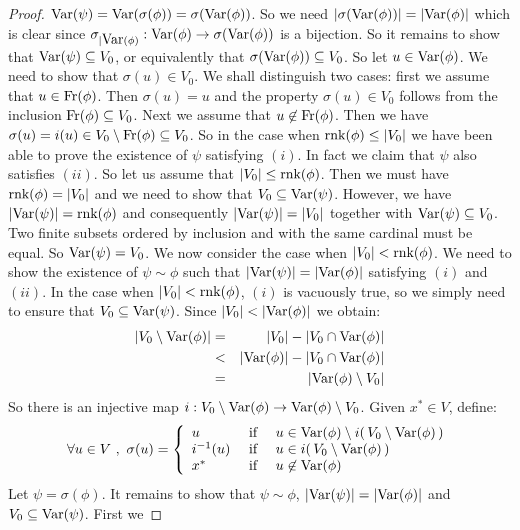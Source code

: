 \begin{proof}
$\mbox{\rm Var}(\psi)=\mbox{\rm Var}(\sigma(\phi))=\sigma(\mbox{\rm Var}(\phi))$. So we need
$|\sigma(\mbox{\rm Var}(\phi))|=|\mbox{\rm Var}(\phi)|$ which is clear since
$\sigma_{|\mbox{\rm Var}(\phi)}:\mbox{\rm Var}(\phi)\to\sigma(\mbox{\rm Var}(\phi))$ is a
bijection. So it remains to show that $\mbox{\rm Var}(\psi)\subseteq V_{0}$,
or equivalently that $\sigma(\mbox{\rm Var}(\phi))\subseteq V_{0}$. So let
$u\in\mbox{\rm Var}(\phi)$. We need to show that $\sigma(u)\in V_{0}$. We
shall distinguish two cases: first we assume that $u\in\mbox{\rm Fr}(\phi)$.
Then $\sigma(u)=u$ and the property $\sigma(u)\in V_{0}$ follows
from the inclusion $\mbox{\rm Fr}(\phi)\subseteq V_{0}$. Next we assume that
$u\not\in\mbox{\rm Fr}(\phi)$. Then we have $\sigma(u)=i(u)\in
V_{0}\setminus\mbox{\rm Fr}(\phi)\subseteq V_{0}$. So in the case when
$\mbox{\rm rnk}(\phi)\leq|V_{0}|$ we have been able to prove the existence of
$\psi$ satisfying $(i)$. In fact we claim that $\psi$ also satisfies
$(ii)$. So let us assume that $|V_{0}|\leq\mbox{\rm rnk}(\phi)$. Then we must
have $\mbox{\rm rnk}(\phi)=|V_{0}|$ and we need to show that
$V_{0}\subseteq\mbox{\rm Var}(\psi)$. However, we have
$|\mbox{\rm Var}(\psi)|=\mbox{\rm rnk}(\phi)$ and consequently $|\mbox{\rm Var}(\psi)|=|V_{0}|$
together with $\mbox{\rm Var}(\psi)\subseteq V_{0}$. Two finite subsets
ordered by inclusion and with the same cardinal must be equal. So
$\mbox{\rm Var}(\psi)=V_{0}$. We now consider the case when
$|V_{0}|<\mbox{\rm rnk}(\phi)$. We need to show the existence of
$\psi\sim\phi$ such that $|\mbox{\rm Var}(\psi)|=|\mbox{\rm Var}(\phi)|$ satisfying
$(i)$ and $(ii)$. In the case when $|V_{0}|<\mbox{\rm rnk}(\phi)$, $(i)$ is
vacuously true, so we simply need to ensure that
$V_{0}\subseteq\mbox{\rm Var}(\psi)$. Since $|V_{0}|<|\var(\phi)|$ we obtain:
    \begin{eqnarray*}
    |V_{0}\setminus\mbox{\rm Var}(\phi)|&=&|V_{0}|-|V_{0}\cap\mbox{\rm Var}(\phi)|\\
    &<&|\mbox{\rm Var}(\phi)|-|V_{0}\cap\mbox{\rm Var}(\phi)|\\
    &=&|\mbox{\rm Var}(\phi)\setminus V_{0}|
    \end{eqnarray*}
So there is an injective map
$i:V_{0}\setminus\mbox{\rm Var}(\phi)\to\mbox{\rm Var}(\phi)\setminus V_{0}$. Given
$x^{*}\in V$, define:
    \[
    \forall u\in V\ ,\ \sigma(u)=\left\{
        \begin{array}{lcl}
        u&\mbox{\ if\ }&u\in\var(\phi)\setminus i(\,V_{0}\setminus\var(\phi)\,)\\
        i^{-1}(u)&\mbox{\ if\ }&u\in i(\,V_{0}\setminus\var(\phi)\,)\\
        x^{*}&\mbox{\ if\ }&u\not\in\var(\phi)
        \end{array}
    \right.
    \]
Let $\psi=\sigma(\phi)$. It remains to show that $\psi\sim\phi$,
$|\mbox{\rm Var}(\psi)|=|\mbox{\rm Var}(\phi)|$ and $V_{0}\subseteq\mbox{\rm Var}(\psi)$. First we

\end{proof}
